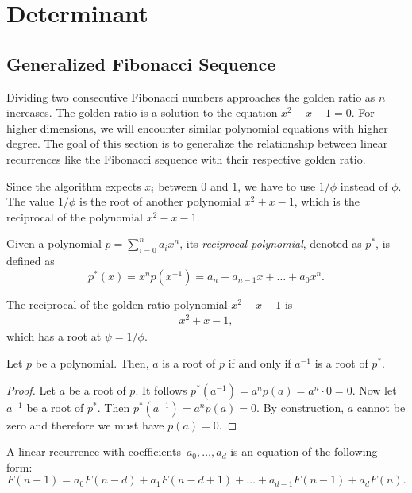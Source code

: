 \documentclass[english,version-2020-11]{uzl-thesis}
\begin{document}
\chapter{Determinant}

\section{Generalized Fibonacci Sequence}

Dividing two consecutive Fibonacci numbers approaches the golden ratio as $n$ increases.
The golden ratio is a solution to the equation $x^2 - x - 1 = 0$.
For higher dimensions, we will encounter similar polynomial equations with higher degree.
The goal of this section is to generalize the relationship between linear
recurrences like the Fibonacci sequence with their respective golden ratio.

Since the algorithm expects $x_i$ between $0$ and $1$, we have to use $1/\phi$ instead of $\phi$.
The value $1/\phi$ is the root of another polynomial $x^2 + x - 1$, which is the reciprocal
of the polynomial $x^2 - x - 1$.

\begin{definition}
  Given a polynomial $p = \sum_{i=0}^n a_i x^n$, its \emph{reciprocal polynomial},
  denoted as $p^*$, is defined as
  \[
    p^*(x) = x^n p(x^{-1}) = a_n + a_{n-1} x + \dots + a_0 x^n.
  \]
\end{definition}

\begin{example}
  The reciprocal of the golden ratio polynomial $x^2 - x - 1$ is
  \begin{align*}
    x^2 + x - 1,
  \end{align*}
  which has a root at $\psi = 1/\phi$.
\end{example}

\begin{lemma}
  Let $p$ be a polynomial. Then, $a$ is a root of $p$ if and only if $a^{-1}$ is a root of $p^*$.
\end{lemma}

\begin{proof}
  Let $a$ be a root of $p$. It follows $p^*(a^{-1}) = a^n p(a) = a^n \cdot 0 = 0$.
  Now let $a^{-1}$ be a root of $p^*$. Then $p^*(a^{-1}) = a^n p(a) = 0$.
  By construction, $a$ cannot be zero and therefore we must have $p(a) = 0$.
\end{proof}

\begin{definition}
  A linear recurrence with coefficients~$a_0, \dots, a_d$ is an equation of the
  following form:
  \[
    F(n + 1) = a_0 F(n - d) + a_1 F(n - d + 1) + \dots + a_{d-1} F(n - 1) + a_d F(n).
  \]
\end{definition}
\end{document}
